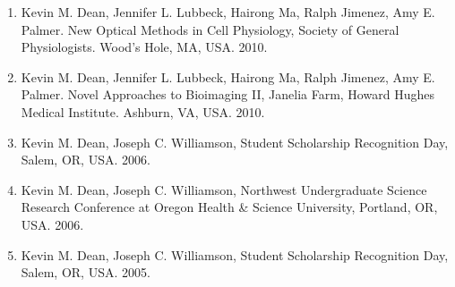 \begin{enumerate}
\item Kevin M. Dean, Jennifer L. Lubbeck, Hairong Ma, Ralph Jimenez, Amy E. Palmer.  New Optical Methods in Cell Physiology, Society of General Physiologists. Wood's Hole, MA, USA. 2010.
\item Kevin M. Dean, Jennifer L. Lubbeck, Hairong Ma, Ralph Jimenez, Amy E. Palmer.  Novel Approaches to Bioimaging II, Janelia Farm, Howard Hughes Medical Institute.  Ashburn, VA, USA. 2010.
\item Kevin M. Dean, Joseph C. Williamson, Student Scholarship Recognition Day, Salem, OR, USA. 2006.
\item Kevin M. Dean, Joseph C. Williamson, Northwest Undergraduate Science Research Conference at Oregon Health \& Science University, Portland, OR, USA. 2006.
\item Kevin M. Dean, Joseph C. Williamson, Student Scholarship Recognition Day, Salem, OR, USA. 2005. 
\end{enumerate}